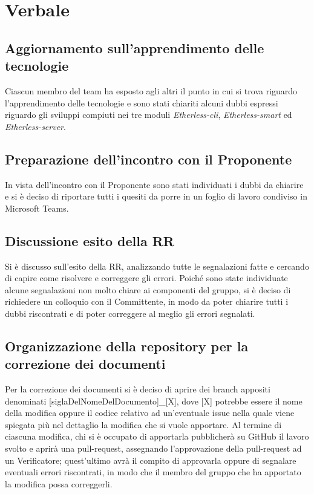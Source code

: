 \section{Verbale}

	\subsection{Aggiornamento sull'apprendimento delle tecnologie}
		Ciascun membro del team ha esposto agli altri il punto in cui si trova riguardo l'apprendimento delle tecnologie e sono stati chiariti alcuni dubbi espressi riguardo gli sviluppi compiuti nei tre moduli \textit{Etherless-cli}, \textit{Etherless-smart} ed \textit{Etherless-server}.
		
	\subsection{Preparazione dell'incontro con il Proponente}
		In vista dell'incontro con il Proponente sono stati individuati i dubbi da chiarire e si è deciso di riportare tutti i quesiti da porre in un foglio di lavoro condiviso in Microsoft Teams.
		
	\subsection{Discussione esito della RR} 
		Si è discusso sull'esito della RR, analizzando tutte le segnalazioni fatte e cercando di capire come risolvere e correggere gli errori.
		Poiché sono state individuate alcune segnalazioni non molto chiare ai componenti del gruppo, si è deciso di richiedere un colloquio con il Committente, in modo da poter chiarire tutti i dubbi riscontrati e di poter correggere al meglio gli errori segnalati.
	
	\subsection{Organizzazione della repository per la correzione dei documenti}
		Per la correzione dei documenti si è deciso di aprire dei branch appositi denominati [siglaDelNomeDelDocumento]\_[X], dove [X] potrebbe essere il nome della modifica oppure il codice relativo ad un'eventuale issue nella quale viene spiegata più nel dettaglio la modifica che si vuole apportare.
		Al termine di ciascuna modifica, chi si è occupato di apportarla pubblicherà su GitHub il lavoro svolto e aprirà una pull-request, assegnando l'approvazione della pull-request ad un Verificatore; quest'ultimo avrà il compito di approvarla oppure di segnalare eventuali errori riscontrati, in modo che il membro del gruppo che ha apportato la modifica possa correggerli.
	
